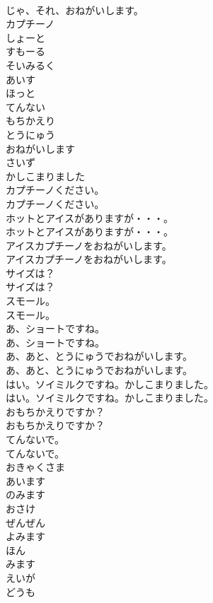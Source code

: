 \documentclass[8pt]{extreport}
\begin{document}
\begin{CJK}{UTF8}{min}
\\	じゃ、それ、おねがいします。 
\\	カプチーノ
\\	しょーと
\\	すもーる
\\	そいみるく
\\	あいす
\\	ほっと
\\	てんない
\\	もちかえり
\\	とうにゅう
\\	おねがいします
\\	さいず
\\	かしこまりました
\\	カプチーノください。	
\\	カプチーノください。 
\\	ホットとアイスがありますが・・・。	
\\	ホットとアイスがありますが・・・。 
\\	アイスカプチーノをおねがいします。	
\\	アイスカプチーノをおねがいします。 
\\	サイズは？	
\\	サイズは？ 
\\	スモール。	
\\	スモール。 
\\	あ、ショートですね。	
\\	あ、ショートですね。 
\\	あ、あと、とうにゅうでおねがいします。	
\\	あ、あと、とうにゅうでおねがいします。 
\\	はい。ソイミルクですね。かしこまりました。	
\\	はい。ソイミルクですね。かしこまりました。 
\\	おもちかえりですか？	
\\	おもちかえりですか？ 
\\	てんないで。	
\\	てんないで。 
\\	おきゃくさま
\\	あいます
\\	のみます
\\	おさけ
\\	ぜんぜん
\\	よみます
\\	ほん
\\	みます
\\	えいが
\\	どうも

\end{CJK}
\end{document}
